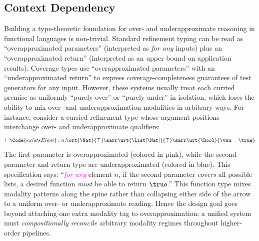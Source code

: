 \subsection{Context Dependency}


Building a type-theoretic foundation for over- and underapproximate reasoning in functional languages is non-trivial.
Standard refinement typing can be read as ``overapproximated parameters'' (interpreted as \emph{for any} inputs) plus an ``overapproximated return'' (interpreted as an upper bound on application results).
Coverage types use ``overapproximated parameters'' with an ``underapproximated return'' to express coverage-completeness guarantees of test generators for any input.
However, these systems usually treat each curried premise as uniformly ``purely over'' or ``purely under'' in isolation, which loses the ability to mix over- and underapproximation modalities in arbitrary ways.
For instance, consider a curried refinement type whose argument positions interchange over- and underapproximate qualifiers:
\begin{align*}
    \vdash \Code{existsElem} : n{:}\ort{\Nat}{\top} \sarr \urt{\List[\Nat]}{\top} \sarr \urt{\Bool}{\vnu = \true}
\end{align*}\noindent
The first parameter is overapproximated (colored in pink), while the second parameter and return type are underapproximated (colored in blue).
This specification says: ``\textcolor{magenta}{\emph{for any}} element $n$, if the second parameter \textcolor{CobaltBlue}{\emph{covers}} all possible lists, a desired  function \textcolor{CobaltBlue}{\emph{must}} be able to return $\true$.''
This function type mixes modality patterns along the spine rather than collapsing either side of the arrow to a uniform over- or underapproximate reading.
Hence the design goal goes beyond attaching one extra modality tag to overapproximation: a unified system must
\emph{compositionally reconcile} arbitrary modality regimes throughout higher-order pipelines.

